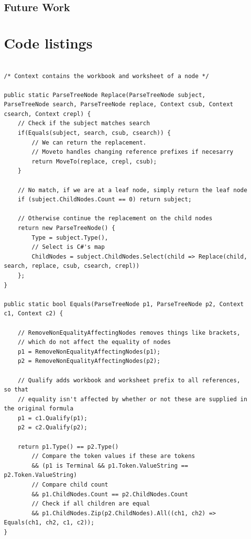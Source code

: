 \documentclass[12pt,a4paper,onecolumn,oneside,parskip]{memoir}
\begin{document}
\section{Future Work}




\appendix

\chapter{Code listings}

\lstset{style=sharpc}
\begin{lstlisting}[float,caption={Formula AST replacement (simplified)}, label={lst:astreplace}]

/* Context contains the workbook and worksheet of a node */

public static ParseTreeNode Replace(ParseTreeNode subject, ParseTreeNode search, ParseTreeNode replace, Context csub, Context csearch, Context crepl) {
	// Check if the subject matches search
	if(Equals(subject, search, csub, csearch)) {
		// We can return the replacement.
		// Moveto handles changing reference prefixes if necesarry 
		return MoveTo(replace, crepl, csub);
	}
	
	// No match, if we are at a leaf node, simply return the leaf node
	if (subject.ChildNodes.Count == 0) return subject;
	
	// Otherwise continue the replacement on the child nodes
	return new ParseTreeNode() {
		Type = subject.Type(),
		// Select is C#'s map
		ChildNodes = subject.ChildNodes.Select(child => Replace(child, search, replace, csub, csearch, crepl))
	};
}

public static bool Equals(ParseTreeNode p1, ParseTreeNode p2, Context c1, Context c2) {
	
	// RemoveNonEqualityAffectingNodes removes things like brackets,
	// which do not affect the equality of nodes
	p1 = RemoveNonEqualityAffectingNodes(p1);
	p2 = RemoveNonEqualityAffectingNodes(p2);
	
	// Qualify adds workbook and worksheet prefix to all references, so that
	// equality isn't affected by whether or not these are supplied in the original formula
	p1 = c1.Qualify(p1);
	p2 = c2.Qualify(p2);
	
	return p1.Type() == p2.Type()
		// Compare the token values if these are tokens
	    && (p1 is Terminal && p1.Token.ValueString == p2.Token.ValueString)
	    // Compare child count
	    && p1.ChildNodes.Count == p2.ChildNodes.Count
	    // Check if all children are equal
	    && p1.ChildNodes.Zip(p2.ChildNodes).All((ch1, ch2) => Equals(ch1, ch2, c1, c2));
}
\end{lstlisting}
\end{document}
